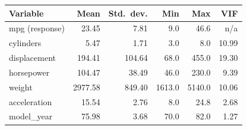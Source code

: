 \begin{tabular}{@{}lrrrrr@{}}
\toprule
Variable & Mean & Std.\ dev. & Min & Max & VIF \\
\midrule
mpg (response) & 23.45 & 7.81 & 9.0 & 46.6 & n/a \\
cylinders & 5.47 & 1.71 & 3.0 & 8.0 & 10.99 \\
displacement & 194.41 & 104.64 & 68.0 & 455.0 & 19.30 \\
horsepower & 104.47 & 38.49 & 46.0 & 230.0 & 9.39 \\
weight & 2977.58 & 849.40 & 1613.0 & 5140.0 & 10.06 \\
acceleration & 15.54 & 2.76 & 8.0 & 24.8 & 2.68 \\
model\_year & 75.98 & 3.68 & 70.0 & 82.0 & 1.27 \\
\bottomrule
\end{tabular}